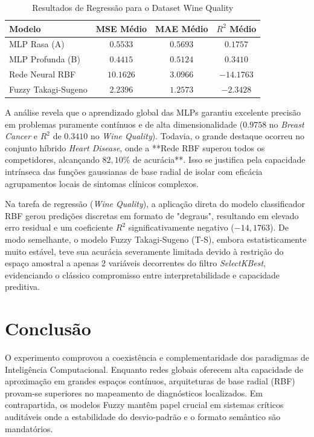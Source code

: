 \documentclass[10pt, journal, compsoc]{IEEEtran}
\begin{document}
\begin{table}[htbp]
\caption{Resultados de Regressão para o Dataset Wine Quality}
\label{tab:regressao}
\centering
\begin{tabular}{lccc}
\toprule
\textbf{Modelo} & \textbf{MSE Médio} & \textbf{MAE Médio} & \textbf{$R^2$ Médio} \\
\midrule
MLP Rasa (A) & $0.5533$ & $0.5693$ & $0.1757$ \\
MLP Profunda (B) & $\mathbf{0.4415}$ & $\mathbf{0.5124}$ & $\mathbf{0.3410}$ \\
Rede Neural RBF & $10.1626$ & $3.0966$ & $-14.1763$ \\
Fuzzy Takagi-Sugeno & $2.2396$ & $1.2573$ & $-2.3428$ \\
\bottomrule
\end{tabular}
\end{table}

A análise revela que o aprendizado global das MLPs garantiu excelente precisão em problemas puramente contínuos e de alta dimensionalidade ($0.9758$ no \textit{Breast Cancer} e $R^2$ de $0.3410$ no \textit{Wine Quality}). Todavia, o grande destaque ocorreu no conjunto híbrido \textit{Heart Disease}, onde a **Rede RBF superou todos os competidores, alcançando $82,10\%$ de acurácia**. Isso se justifica pela capacidade intrínseca das funções gaussianas de base radial de isolar com eficácia agrupamentos locais de sintomas clínicos complexos.

Na tarefa de regressão (\textit{Wine Quality}), a aplicação direta do modelo classificador RBF gerou predições discretas em formato de "degraus", resultando em elevado erro residual e um coeficiente $R^2$ significativamente negativo ($-14,1763$). De modo semelhante, o modelo Fuzzy Takagi-Sugeno (T-S), embora estatisticamente muito estável, teve sua acurácia severamente limitada devido à restrição do espaço amostral a apenas 2 variáveis decorrentes do filtro \textit{SelectKBest}, evidenciando o clássico compromisso entre interpretabilidade e capacidade preditiva.

\section{Conclusão}
O experimento comprovou a coexistência e complementaridade dos paradigmas de Inteligência Computacional. Enquanto redes globais oferecem alta capacidade de aproximação em grandes espaços contínuos, arquiteturas de base radial (RBF) provam-se superiores no mapeamento de diagnósticos localizados. Em contrapartida, os modelos Fuzzy mantêm papel crucial em sistemas críticos auditáveis onde a estabilidade do desvio-padrão e o formato semântico são mandatórios.



\end{document}
